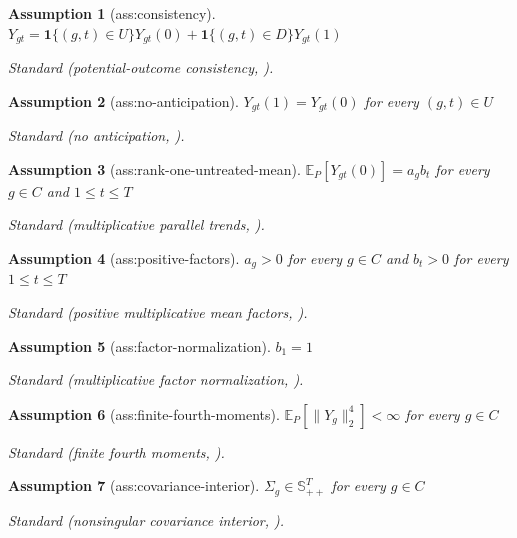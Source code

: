 \documentclass{article}
\newtheorem{assumption}{Assumption}
\begin{document}
\begin{assumption}[ass:consistency]\label{ass:consistency}
\(Y_{gt}=\mathbf 1\{(g,t)\in U\}Y_{gt}(0)+\mathbf 1\{(g,t)\in D\}Y_{gt}(1)\)
\par\smallskip\noindent\emph{Standard} (potential-outcome consistency, \cite{MoreauKastler2025}).
\end{assumption}

\begin{assumption}[ass:no-anticipation]\label{ass:no-anticipation}
\(Y_{gt}(1)=Y_{gt}(0)\) for every \((g,t)\in U\)
\par\smallskip\noindent\emph{Standard} (no anticipation, \cite{BorusyakJaravelSpiess2024}).
\end{assumption}

\begin{assumption}[ass:rank-one-untreated-mean]\label{ass:rank-one-untreated-mean}
\(\mathbb E_P[Y_{gt}(0)]=a_gb_t\) for every \(g\in C\) and \(1\le t\le T\)
\par\smallskip\noindent\emph{Standard} (multiplicative parallel trends, \cite{CianiFisher2019}).
\end{assumption}

\begin{assumption}[ass:positive-factors]\label{ass:positive-factors}
\(a_g>0\) for every \(g\in C\) and \(b_t>0\) for every \(1\le t\le T\)
\par\smallskip\noindent\emph{Standard} (positive multiplicative mean factors, \cite{MoreauKastler2025}).
\end{assumption}

\begin{assumption}[ass:factor-normalization]\label{ass:factor-normalization}
\(b_1=1\)
\par\smallskip\noindent\emph{Standard} (multiplicative factor normalization, \cite{KiralyTheranTomioka2015}).
\end{assumption}

\begin{assumption}[ass:finite-fourth-moments]\label{ass:finite-fourth-moments}
\(\mathbb E_P[\|Y_g\|_2^4]<\infty\) for every \(g\in C\)
\par\smallskip\noindent\emph{Standard} (finite fourth moments, \cite{Newey1990}).
\end{assumption}

\begin{assumption}[ass:covariance-interior]\label{ass:covariance-interior}
\(\Sigma_g\in\mathbb S_{++}^T\) for every \(g\in C\)
\par\smallskip\noindent\emph{Standard} (nonsingular covariance interior, \cite{Chamberlain1987}).
\end{assumption}
\end{document}
